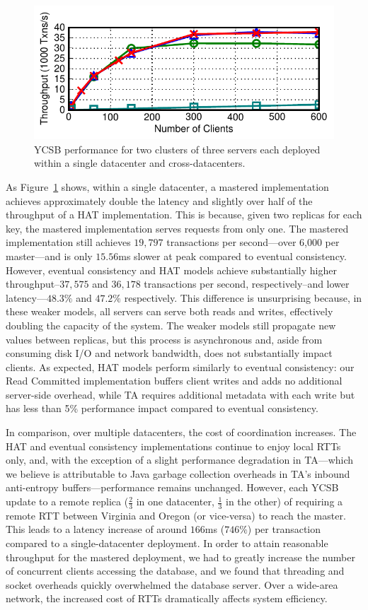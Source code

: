 \begin{figure}[t!]
\includegraphics[width=\columnwidth]{figs/wan-threads-thru.pdf}
\caption{YCSB performance for two clusters of three servers each
  deployed within a single datacenter and cross-datacenters.}
\label{fig:wan-exp}
\end{figure}

As Figure~\ref{fig:wan-exp} shows, within a single datacenter, a
mastered implementation achieves approximately double the latency and
slightly over half of the throughput of a HAT implementation. This is
because, given two replicas for each key, the mastered implementation
serves requests from only one. The mastered implementation still
achieves $19,797$ transactions per second---over 6,000 per
master---and is only $15.56$ms slower at peak compared to eventual
consistency. However, eventual consistency and HAT models achieve
substantially higher throughput--$37,575$ and $36,178$ transactions
per second, respectively--and lower latency---$48.3\%$ and $47.2\%$
respectively. This difference is unsurprising because, in these weaker
models, all servers can serve both reads and writes, effectively
doubling the capacity of the system. The weaker models still propagate
new values between replicas, but this process is asynchronous and,
aside from consuming disk I/O and network bandwidth, does not
substantially impact clients. As expected, HAT models perform
similarly to eventual consistency: our Read Committed implementation
buffers client writes and adds no additional server-side overhead,
while TA requires additional metadata with each write but has less
than 5\% performance impact compared to eventual consistency.

In comparison, over multiple datacenters, the cost of coordination
increases. The HAT and eventual consistency implementations continue
to enjoy local RTTs only, and, with the exception of a slight
performance degradation in TA---which we believe is attributable to
Java garbage collection overheads in TA's inbound anti-entropy
buffers---performance remains unchanged. However, each YCSB update to
a remote replica ($\frac{2}{3}$ in one datacenter, $\frac{1}{3}$ in
the other) of requiring a remote RTT between Virginia and Oregon (or
vice-versa) to reach the master. This leads to a latency increase of
around $166$ms ($746\%$) per transaction compared to a
single-datacenter deployment. In order to attain reasonable throughput
for the mastered deployment, we had to greatly increase the number of
concurrent clients accessing the database, and we found that threading
and socket overheads quickly overwhelmed the database server. Over a
wide-area network, the increased cost of RTTs dramatically affects
system efficiency.

